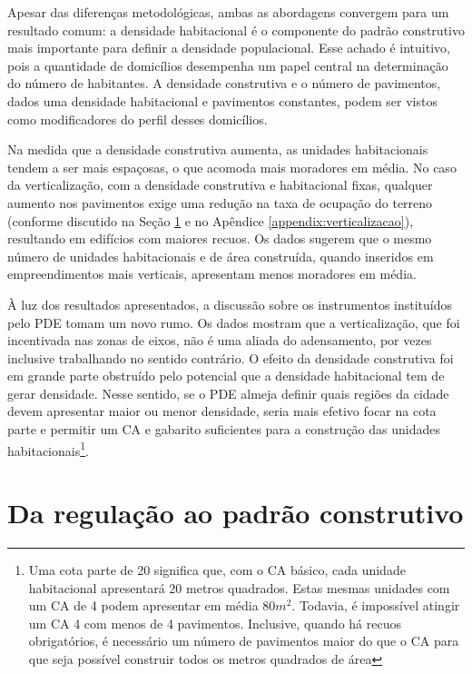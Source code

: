 Apesar das diferenças metodológicas, ambas as abordagens convergem para um resultado comum: a densidade habitacional é o componente do padrão construtivo mais importante para definir a densidade populacional. Esse achado é intuitivo, pois a quantidade de domicílios desempenha um papel central na determinação do número de habitantes. A densidade construtiva e o número de pavimentos, dados uma densidade habitacional e pavimentos constantes, podem ser vistos como modificadores do perfil desses domicílios.

Na medida que a densidade construtiva aumenta, as unidades habitacionais tendem a ser mais espaçosas, o que acomoda mais moradores em média. No caso da verticalização, com a densidade construtiva e habitacional fixas, qualquer aumento nos pavimentos exige uma redução na taxa de ocupação do terreno (conforme discutido na Seção \ref{sec:perg2} e no Apêndice \ref{appendix:verticalizacao}), resultando em edifícios com maiores recuos. Os dados sugerem que o mesmo número de unidades habitacionais e de área construída, quando inseridos em empreendimentos mais verticais, apresentam menos moradores em média. 

À luz dos resultados apresentados, a discussão sobre os instrumentos instituídos pelo PDE tomam um novo rumo. Os dados mostram que a verticalização, que foi incentivada nas zonas de eixos, não é uma aliada do adensamento, por vezes inclusive trabalhando no sentido contrário. O efeito da densidade construtiva foi em grande parte obstruído pelo potencial que a densidade habitacional tem de gerar densidade. Nesse sentido, se o PDE almeja definir quais regiões da cidade devem apresentar maior ou menor densidade, seria mais efetivo focar na cota parte e permitir um CA e gabarito suficientes para a construção das unidades habitacionais\footnote{Uma cota parte de 20 significa que, com o CA básico, cada unidade habitacional apresentará 20 metros quadrados. Estas mesmas unidades com um CA de 4 podem apresentar em média 80$m^2$. Todavia, é impossível atingir um CA 4 com menos de 4 pavimentos. Inclusive, quando há recuos obrigatórios, é necessário um número de pavimentos maior do que o CA para que seja possível construir todos os metros quadrados de área}.  

\clearpage
\section{Da regulação ao padrão construtivo}
\label{sec:perg2}

